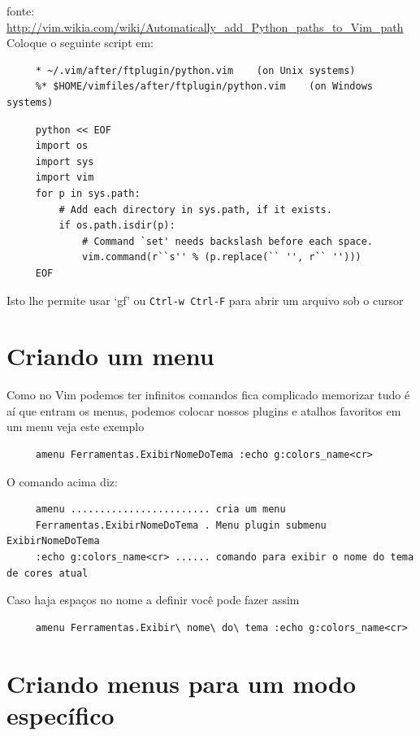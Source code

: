 \documentclass[10pt,a4paper,openany]{book}
\begin{document}
fonte:
\url{http://vim.wikia.com/wiki/Automatically_add_Python_paths_to_Vim_path}
Coloque o seguinte script em:

\begin{verbatim}
     * ~/.vim/after/ftplugin/python.vim    (on Unix systems)
     %* $HOME/vimfiles/after/ftplugin/python.vim    (on Windows systems)
\end{verbatim}

\begin{verbatim}
     python << EOF
     import os
     import sys
     import vim
     for p in sys.path:
         # Add each directory in sys.path, if it exists.
         if os.path.isdir(p):
             # Command `set' needs backslash before each space.
             vim.command(r``s'' % (p.replace(`` '', r`` '')))
     EOF
\end{verbatim}

Isto lhe permite usar `gf' ou {\tt Ctrl-w Ctrl-F} para abrir um arquivo sob o cursor

\section{Criando um menu}
\label{Criando um menu}

Como no Vim podemos ter infinitos comandos fica complicado memorizar tudo
é aí que entram os menus, podemos colocar nossos plugins e atalhos favoritos
em um menu veja este exemplo

\begin{verbatim}
     amenu Ferramentas.ExibirNomeDoTema :echo g:colors_name<cr>
\end{verbatim}

O comando acima diz:

\begin{verbatim}
     amenu ........................ cria um menu
     Ferramentas.ExibirNomeDoTema . Menu plugin submenu ExibirNomeDoTema
     :echo g:colors_name<cr> ...... comando para exibir o nome do tema de cores atual
\end{verbatim}

Caso haja espaços no nome a definir você pode fazer assim

\begin{verbatim}
     amenu Ferramentas.Exibir\ nome\ do\ tema :echo g:colors_name<cr>
\end{verbatim}

\section{Criando menus para um modo específico}
\label{Criando menus para um modo específico}
\end{document}
